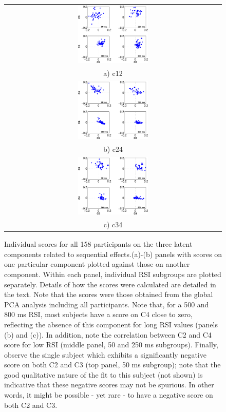 \documentclass[12pt,letterpaper]{article}
\begin{document}
\begin{figure}[t]
\centering
\begin{tabular}{c}
\includegraphics[width=0.33\textwidth]{C2_vs_C3.pdf}\\
a) c12\\
\includegraphics[width=0.33\textwidth]{C2_vs_C4.pdf}\\
b) c24\\
\includegraphics[width=0.33\textwidth]{C3_vs_C4.pdf}\\
c) c34
\end{tabular}
\caption[Individual scores]{Individual scores for all 158 participants on the three latent components related to sequential effects.(a)-(b) panels with scores on one particular component plotted against those on another component. Within each panel, individual RSI subgroups are plotted separately. Details of how the scores were calculated are detailed in the text. Note that the scores were those obtained from the global PCA analysis including all participants. Note that, for a 500 and 800 ms RSI, most subjects have a score on C4 close to zero, reflecting the absence of this component for long RSI values (panels (b) and (c)). In addition, note the correlation between C2 and C4 score for low RSI (middle panel, 50 and 250 ms subgroups). Finally, observe the single subject which exhibits a significantly negative score on both C2 and C3 (top panel, 50 ms subgroup); note that the good qualitative nature of the fit to this subject (not shown) is indicative that these negative scores may not be spurious. In other words, it might be possible - yet rare - to have a negative score on both C2 and C3.}
\end{figure}
\end{document}
